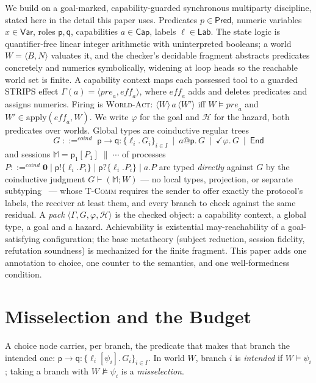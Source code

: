 \documentclass[a4paper,UKenglish,cleveref,autoref,thm-restate,anonymous]{lipics-v2021}
\newcommand{\CapS}{\mathsf{Cap}}
\newcommand{\Pred}{\mathsf{Pred}}
\newcommand{\Var}{\mathsf{Var}}
\newcommand{\Lab}{\mathsf{Lab}}
\newcommand{\pre}{\mathit{pre}}
\newcommand{\eff}{\mathit{eff}}
\newcommand{\apply}{\mathrm{apply}}
\newcommand{\coind}{\mathrel{::=^{\mathit{coind}}}}
\newcommand{\MM}{\mathbb{M}}
\newcommand{\ppar}{\;\|\;}
\newcommand{\End}{\mathsf{End}}
\newcommand{\Haz}{\mathcal H}
\begin{document}
We build on a goal-marked, capability-guarded synchronous multiparty
discipline, stated here in the detail this paper uses. Predicates
$p\in\Pred$, numeric variables $x\in\Var$, roles $\mathsf p,\mathsf q$,
capabilities $a\in\CapS$, labels $\ell\in\Lab$. The state logic is
quantifier-free linear integer arithmetic with uninterpreted booleans; a world
$W=\langle B,N\rangle$ valuates it, and the checker's decidable fragment
abstracts predicates concretely and numerics symbolically, widening at loop
heads so the reachable world set is finite. A capability context maps each
possessed tool to a guarded STRIPS effect
$\Gamma(a)=\langle\pre_a,\eff_a\rangle$, where $\eff_a$ adds and deletes
predicates and assigns numerics. Firing is \textsc{World-Act}:
$\langle W\rangle\,a\,\langle W'\rangle$ iff $W\vDash\pre_a$ and
$W'\in\apply(\eff_a,W)$. We write $\varphi$ for the goal and $\Haz$ for the
hazard, both predicates over worlds. Global types are coinductive regular trees
\[
G \;\coind\; \mathsf{p}{\to}\mathsf{q}:\{\ell_i.\,G_i\}_{i\in I}
  \ \mid\ a@\mathsf{p}.\,G \ \mid\ \checkmark\varphi.\,G \ \mid\ \End
\]
and sessions $\MM=\mathsf p_1[P_1]\ppar\cdots$ of processes
$P\coind\mathbf 0\mid\mathsf p!\{\ell_i.P_i\}\mid\mathsf p?\{\ell_i.P_i\}\mid a.P$
are typed \emph{directly} against $G$ by the coinductive judgment
$G\vdash(\MM;W)$ --- no local types, projection, or separate
subtyping~\cite{jongmans-ecoop23,castro-popl26} --- whose \textsc{T-Comm}
requires the sender to offer exactly the protocol's labels, the receiver at
least them, and every branch to check against the same residual. A \emph{pack}
$\langle\Gamma,G,\varphi,\Haz\rangle$ is the checked object: a capability
context, a global type, a goal and a hazard. Achievability is existential
may-reachability of a goal-satisfying configuration; the base metatheory
(subject reduction, session fidelity, refutation soundness) is mechanized for
the finite fragment. This paper adds one annotation to choice, one counter to
the semantics, and one well-formedness condition.

\section{Misselection and the Budget}\label{sec:mis}

\begin{definition}\label{def:guarded}
A choice node carries, per branch, the predicate that makes that branch the
intended one: $\mathsf p{\to}\mathsf q:\{\ell_i[\psi_i].\,G_i\}_{i\in I}$. In
world $W$, branch $i$ is \emph{intended} if $W\vDash\psi_i$; taking a branch
with $W\nvDash\psi_i$ is a \emph{misselection}.
\end{definition}
\end{document}
